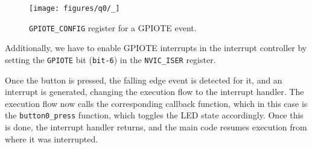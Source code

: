 \begin{figure}[h]
    \centering
    \texttt{[image: figures/q0/\_]}
    \vspace*{-3.5em}
    \caption{
        \texttt{GPIOTE\_CONFIG} register for a GPIOTE event.
    }\label{fig:gpiote-config}
\end{figure}

Additionally, we have to enable GPIOTE interrupts in the interrupt controller by setting the \texttt{GPIOTE} bit (\texttt{bit-6}) in the \texttt{NVIC\_ISER} register.

Once the button is pressed, the falling edge event is detected for it, and an interrupt is generated, changing the execution flow to the interrupt handler.
The execution flow now calls the corresponding callback function, which in this case is the \texttt{button0\_press} function, which toggles the LED state accordingly.
Once this is done, the interrupt handler returns, and the main code resumes execution from where it was interrupted.
